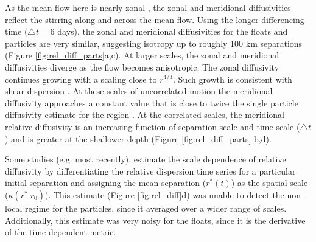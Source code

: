 \documentclass[]{ametsoc}
\begin{document}

As the mean flow here is nearly zonal \citep{balwada2016}, the zonal and meridional diffusivities reflect the stirring along and across the mean flow. Using the longer differencing time ($\triangle t=6$ days), the zonal and meridional diffusivities for the floats and particles are very similar, suggesting isotropy up to roughly 100 km separations (Figure \ref{fig:rel_diff_parts}a,c). At larger scales, the zonal and meridional diffusivities diverge as the flow becomes anisotropic. The zonal diffusivity continues growing with a scaling close to $r^{4/3}$. Such growth is consistent with shear dispersion \citep{bennett1984relative,lacasce2008statistics}. At these scales of uncorrelated motion the meridional diffusivity approaches a constant value that is close to twice the single particle diffusivity estimate for the region \citep{lacasce2014, balwada2016}. At the correlated scales, the meridional relative diffusivity is an increasing function of separation scale and time scale ($\triangle t$) and is greater at the shallower depth (Figure \ref{fig:rel_diff_parts} b,d).


Some studies (e.g. \cite{sinha2019modulation, sanson2015surface} most recently), estimate the scale dependence of relative diffusivity by differentiating the relative dispersion time series for a particular initial separation and assigning the mean separation ($r^*(t)$) as the spatial scale ($\kappa(r^*|r_0)$). This estimate (Figure \ref{fig:rel_diff}d) was unable to detect the non-local regime for the particles, since it averaged over a wider range of scales. Additionally, this estimate was very noisy for the floats, since it is the derivative of the time-dependent metric.
\end{document}
